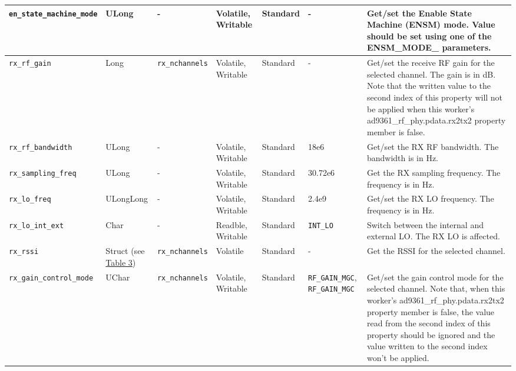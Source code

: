 \documentclass{article}
\begin{document}
\begin{landscape}
\begin{scriptsize}
\begin{longtable}{|p{3.6cm}|p{8.1cm}|p{1.4cm}|p{1.3cm}|p{1.4cm}|p{2.5cm}|p{3.6cm}|}
			\hline
			\verb+en_state_machine_mode+ & ULong & - & Volatile, Writable & Standard & - & Get/set the Enable State Machine (ENSM) mode. Value should be set using one of the ENSM\_MODE\_ parameters.\\
			\hline
			\verb+rx_rf_gain+ & Long & \verb+rx_nchannels+ & Volatile, Writable & Standard & - & Get/set the receive RF gain for the selected channel. The gain is in dB. Note that the written value to the second index of this property will not be applied when this worker's ad9361\_rf\_phy.pdata.rx2tx2 property member is false.\\
			\hline
			\verb+rx_rf_bandwidth+ & ULong & - & Volatile, Writable & Standard & 18e6 & Get/set the RX RF bandwidth. The bandwidth is in Hz.\\
			\hline
			\verb+rx_sampling_freq+ & ULong & - & Volatile, Writable & Standard & 30.72e6 & Get the RX sampling frequency. The frequency is in Hz. \\
			\hline
			\verb+rx_lo_freq+ & ULongLong & - & Volatile, Writable & Standard & 2.4e9 & Get/set the RX LO frequency. The frequency is in Hz. \\
			\hline
			\verb+rx_lo_int_ext+ & Char & - & Readble, Writable & Standard & \verb+INT_LO+ & Switch between the internal and external LO. The RX LO is affected. \\
			\hline
			\verb+rx_rssi+ & Struct (see \hyperlink{tab3}{Table 3}) & \verb+rx_nchannels+ & Volatile & Standard & - & Get the RSSI for the selected channel. \\
			\hline
			\verb+rx_gain_control_mode+ & UChar & \verb+rx_nchannels+ & Volatile, Writable & Standard & \verb+RF_GAIN_MGC+, \verb+RF_GAIN_MGC+ & Get/set the gain control mode for the selected channel. Note that, when this worker's ad9361\_rf\_phy.pdata.rx2tx2 property member is false, the value read from the second index of this property should be ignored and the value written to the second index won't be applied. \\
			\hline

\end{longtable}
\end{scriptsize}
\end{landscape}
\end{document}
